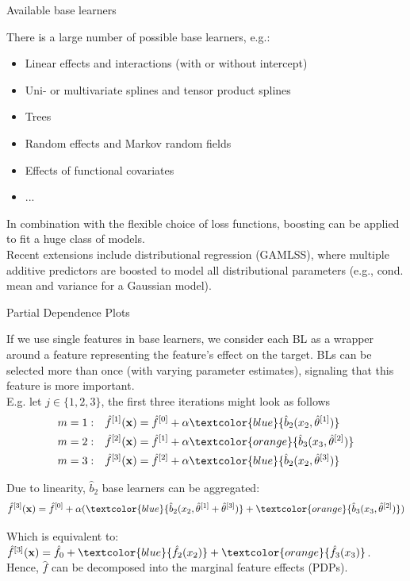 \documentclass[11pt,compress,t,notes=noshow, xcolor=table]{beamer}
\begin{document}
\begin{vbframe}{Available base learners}

There is a large number of possible base learners, e.g.:

\begin{itemize}
  \item Linear effects and interactions (with or without intercept)
  \item Uni- or multivariate splines and tensor product splines
  \item Trees
  \item Random effects and Markov random fields
  \item Effects of functional covariates
  \item ...
\end{itemize}

\lz

In combination with the flexible choice of loss functions, boosting can be applied to fit a huge class of models.\\ 
\vspace{0.1cm}
Recent extensions include distributional regression (GAMLSS), where multiple additive predictors are boosted to model all distributional parameters (e.g., cond. mean and variance for a Gaussian model).

\end{vbframe}
\begin{vbframe}{Partial Dependence Plots }

If we use single features in base learners, we consider each BL as a wrapper around a feature representing the feature's effect on the target. BLs can be selected more than once (with varying parameter estimates), signaling that this feature is more important.\\
E.g. let $j \in \{ 1,2,3 \}$, the first three iterations might look as follows
\begin{align*}
m = 1: \quad & \hat{f}^{[1]}(\xv) = \hat{f}^{[0]} + \alpha \textcolor{blue}{\hat{b}_2(x_2, \hat{\theta}^{[1]})}\\
m = 2: \quad & \hat{f}^{[2]}(\xv) = \hat{f}^{[1]} + \alpha  \textcolor{orange}{\hat{b}_3(x_3, \hat{\theta}^{[2]})}\\
m = 3: \quad & \hat{f}^{[3]}(\xv) = \hat{f}^{[2]} + \alpha \textcolor{blue}{\hat{b}_2(x_2, \hat{\theta}^{[3]})}
\end{align*}

Due to linearity, $\hat{b}_2$ base learners can be aggregated:
$$
\hat{f}^{[3]}(\xv) = \hat{f}^{[0]} + \alpha (\textcolor{blue}{\hat{b}_2(x_2, \hat{\theta}^{[1]} + \hat{\theta}^{[3]})} + \textcolor{orange}{\hat{b}_3(x_3, \hat{\theta}^{[2]})})
$$

Which is equivalent to:
$\hat{f}^{[3]}(\xv) = \hat{f}_0 + \textcolor{blue}{\hat{f}_2(x_2)} + \textcolor{orange}{\hat{f}_3(x_3)}$.\\
Hence, $\hat{f}$ can be decomposed into the marginal feature effects (PDPs).



\end{vbframe}
\end{document}
